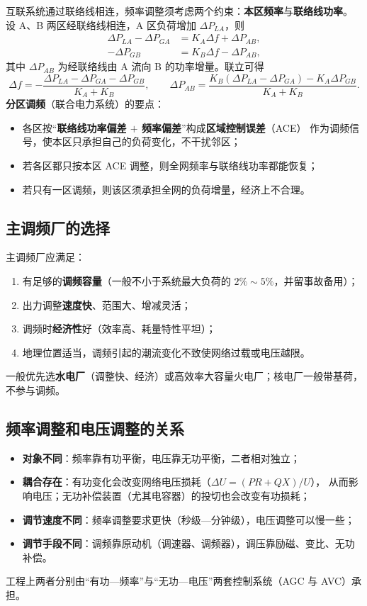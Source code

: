 互联系统通过联络线相连，频率调整须考虑两个约束：\textbf{本区频率}与\textbf{联络线功率}。
设 A、B 两区经联络线相连，A 区负荷增加 $\Delta P_{LA}$，则
\begin{align}
  \Delta P_{LA}-\Delta P_{GA}&=K_A\Delta f+\Delta P_{AB},\\
  -\Delta P_{GB}&=K_B\Delta f-\Delta P_{AB},
\end{align}
其中 $\Delta P_{AB}$ 为经联络线由 A 流向 B 的功率增量。联立可得
\begin{equation}
  \Delta f=-\frac{\Delta P_{LA}-\Delta P_{GA}-\Delta P_{GB}}{K_A+K_B},
  \qquad
  \Delta P_{AB}=\frac{K_B\left(\Delta P_{LA}-\Delta P_{GA}\right)-K_A\Delta P_{GB}}{K_A+K_B}.
\end{equation}
\textbf{分区调频}（联合电力系统）的要点：
\begin{itemize}
  \item 各区按“\textbf{联络线功率偏差 $+$ 频率偏差}”构成\textbf{区域控制误差}（ACE）
        作为调频信号，使本区只承担自己的负荷变化，不干扰邻区；
  \item 若各区都只按本区 ACE 调整，则全网频率与联络线功率都能恢复；
  \item 若只有一区调频，则该区须承担全网的负荷增量，经济上不合理。
\end{itemize}

\subsection{主调频厂的选择}

主调频厂应满足：
\begin{enumerate}
  \item 有足够的\textbf{调频容量}（一般不小于系统最大负荷的 $2\%\sim5\%$，并留事故备用）；
  \item 出力调整\textbf{速度快}、范围大、增减灵活；
  \item 调频时\textbf{经济性}好（效率高、耗量特性平坦）；
  \item 地理位置适当，调频引起的潮流变化不致使网络过载或电压越限。
\end{enumerate}
一般优先选\textbf{水电厂}（调整快、经济）或高效率大容量火电厂；核电厂一般带基荷，不参与调频。

\subsection{频率调整和电压调整的关系}

\begin{itemize}
  \item \textbf{对象不同}：频率靠有功平衡，电压靠无功平衡，二者相对独立；
  \item \textbf{耦合存在}：有功变化会改变网络电压损耗（$\Delta U=(PR+QX)/U$），
        从而影响电压；无功补偿装置（尤其电容器）的投切也会改变有功损耗；
  \item \textbf{调节速度不同}：频率调整要求更快（秒级—分钟级），电压调整可以慢一些；
  \item \textbf{调节手段不同}：调频靠原动机（调速器、调频器），调压靠励磁、变比、无功补偿。
\end{itemize}
工程上两者分别由“有功—频率”与“无功—电压”两套控制系统（AGC 与 AVC）承担。

